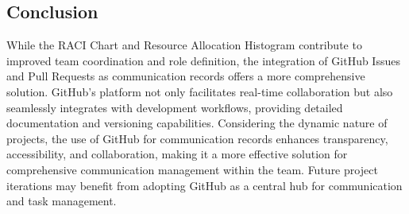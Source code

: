 \documentclass[12pt,titlepage,a4paper]{report}
\begin{document}
        \subsection{Conclusion}
        While the RACI Chart and Resource Allocation Histogram contribute to improved team coordination and role definition, the integration of GitHub Issues and Pull Requests as communication records offers a more comprehensive solution. GitHub's platform not only facilitates real-time collaboration but also seamlessly integrates with development workflows, providing detailed documentation and versioning capabilities. Considering the dynamic nature of projects, the use of GitHub for communication records enhances transparency, accessibility, and collaboration, making it a more effective solution for comprehensive communication management within the team. Future project iterations may benefit from adopting GitHub as a central hub for communication and task management.
\end{document}
